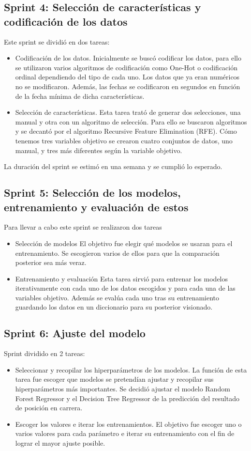 \subsection{Sprint 4: Selección de características y codificación de los datos}
Este sprint se dividió en dos tareas:
\begin{itemize}
\item 
    Codificación de los datos.
    Inicialmente se buscó codificar los datos, para ello se utilizaron varios algoritmos de codificación como One-Hot o codificación ordinal dependiendo del tipo de cada uno. Los datos que ya eran numéricos no se modificaron. Además, las fechas se codificaron en segundos en función de la fecha mínima de dicha características.
    \item 
    Selección de características.
    Esta tarea trató de generar dos selecciones, una manual y otra con un algoritmo de selección. Para ello se buscaron algoritmos y se decantó por el algoritmo Recursive Feature Elimination (RFE). Cómo tenemos tres variables objetivo se crearon cuatro conjuntos de datos, uno manual, y tres más diferentes según la variable objetivo.
\end{itemize}
La duración del sprint se estimó en una semana y se cumplió lo esperado.

\subsection{Sprint 5: Selección de los modelos, entrenamiento y evaluación de estos}
Para llevar a cabo este sprint se realizaron dos tareas
\begin{itemize}
    \item Selección de modelos
    El objetivo fue elegir qué modelos se usaran para el entrenamiento. Se escogieron varios de ellos para que la comparación posterior sea más veraz.
    \item Entrenamiento y evaluación
    Esta tarea sirvió para entrenar los modelos iterativamente con cada uno de los datos escogidos y para cada una de las variables objetivo. Además se evalúa cada uno tras su entrenamiento guardando los datos en un diccionario para su posterior visionado.
\end{itemize}

\subsection{Sprint 6: Ajuste del modelo}
Sprint dividido en 2 tareas:
\begin{itemize}
    \item 
    Seleccionar y recopilar los hiperparámetros de los modelos.
    La función de esta tarea fue escoger que modelos se pretendían ajustar y recopilar sus hiperparámetros más importantes. Se decidió ajustar el modelo Random Forest Regressor y el Decision Tree Regressor de la predicción del resultado de posición en carrera.
    \item 
    Escoger los valores e iterar los entrenamientos.
    El objetivo fue escoger uno o varios valores para cada parámetro e iterar su entrenamiento con el fin de lograr el mayor ajuste posible.
\end{itemize}

